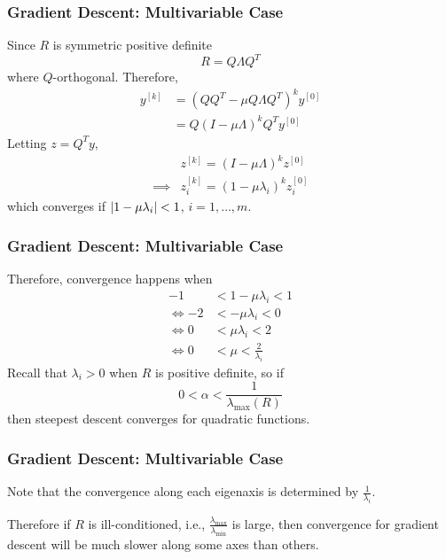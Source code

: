 \documentclass{beamer}
\begin{document}
\begin{frame}\frametitle{Gradient Descent: Multivariable Case}
	Since $R$ is symmetric positive definite
	\[ 
		R = Q\Lambda Q^T 
	\]
	where $Q$-orthogonal.
	Therefore,
	\begin{align*}
		y^{[k]} 
			&= (QQ^T-\mu Q\Lambda Q^T)^ky^{[0]}\\
			&= Q(I-\mu\Lambda)^kQ^Ty^{[0]}
	\end{align*}
	Letting $z = Q^Ty$,
	\begin{align}
		& z^{[k]} = (I - \mu\Lambda)^kz^{[0]}\\
		\implies &
		z^{[k]}_i = (1 - \mu \lambda_i)^kz_i^{[0]}
	\end{align}
	which converges if $\left|1-\mu\lambda_i\right| < 1$, $i = 1, \ldots, m$.	
\end{frame}

\begin{frame}\frametitle{Gradient Descent: Multivariable Case}
	Therefore, convergence happens when
	\begin{align*}
	-1 &< 1 - \mu \lambda_i < 1 \\
	\iff -2 &< -\mu\lambda_i < 0\\
	\iff 0 &< \mu\lambda_i < 2\\
	\iff 0 &< \mu < \frac{2}{\lambda_i} 
	\end{align*}
	Recall that $\lambda_i > 0$ when $R$ is positive definite, 
	so if
	\[ 
		0 < \alpha < \frac{1}{\lambda_{\max}(R)} 
	\]
	then steepest descent converges for quadratic functions.
\end{frame}

\begin{frame}\frametitle{Gradient Descent: Multivariable Case}
	Note that the convergence along each eigenaxis is determined by 
	\(
		\frac{1}{\lambda_i}.
	\)	
	
	\vfill

	Therefore if $R$ is ill-conditioned, i.e., $\displaystyle \frac{\lambda_{\max}}{\lambda_{\min}}$ is large, then convergence for gradient descent will be much slower along some axes than others.	
\end{frame}
\end{document}

